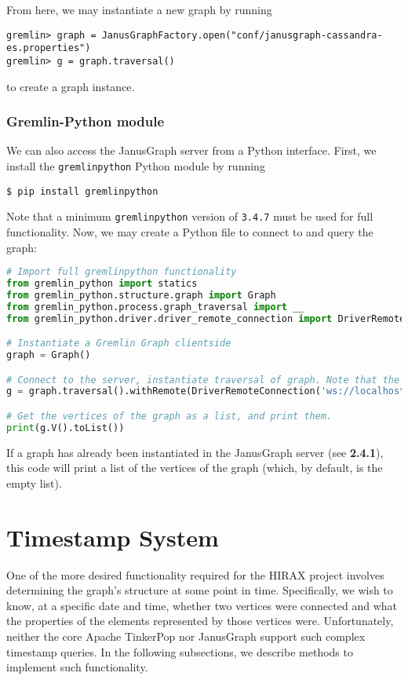 \documentclass[12pt]{article}
\newcommand{\code}[1]{\colorbox{backcolour}{\texttt{#1}}}
\begin{document}
From here, we may instantiate a new graph by running
\begin{lstlisting}[numbers=none]
gremlin> graph = JanusGraphFactory.open("conf/janusgraph-cassandra-es.properties")
gremlin> g = graph.traversal()
\end{lstlisting}
to create a graph instance.

\subsubsection{Gremlin-Python module}

We can also access the JanusGraph server from a Python interface. First, we install the \code{gremlinpython} Python module by running
\begin{lstlisting}[numbers=none]
$ pip install gremlinpython
\end{lstlisting}

Note that a minimum \code{gremlinpython} version of \code{3.4.7} must be used for full functionality. Now, we may create a Python file to connect to and query the graph:
\begin{lstlisting}[language=Python]
# Import full gremlinpython functionality
from gremlin_python import statics
from gremlin_python.structure.graph import Graph
from gremlin_python.process.graph_traversal import __
from gremlin_python.driver.driver_remote_connection import DriverRemoteConnection

# Instantiate a Gremlin Graph clientside
graph = Graph()

# Connect to the server, instantiate traversal of graph. Note that the server is opened on port 8182 by default.
g = graph.traversal().withRemote(DriverRemoteConnection('ws://localhost:8182/gremlin','g'))

# Get the vertices of the graph as a list, and print them.
print(g.V().toList())

\end{lstlisting}

If a graph has already been instantiated in the JanusGraph server (see \textbf{2.4.1}), this code will print a list of the vertices of the graph (which, by default, is the empty list).

\section{Timestamp System}

One of the more desired functionality required for the HIRAX project involves determining the graph's structure at some point in time. Specifically, we wish to know, at a specific date and time, whether two vertices were connected and what the properties of the elements represented by those vertices were. Unfortunately, neither the core Apache TinkerPop nor JanusGraph support such complex timestamp queries. In the following subsections, we describe methods to implement such functionality.
\end{document}
